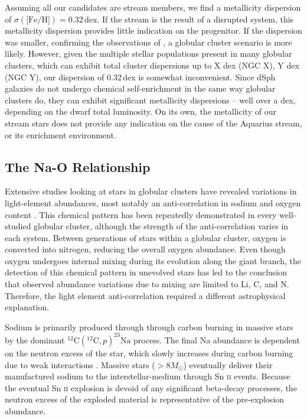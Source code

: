 \documentclass{emulateapj}
\begin{document}
Assuming all our candidates are stream members, we find a metallicity dispersion of $\sigma(\mbox{[Fe/H]}) = 0.32$\,dex. If the stream is the result of a disrupted system, this metallicity dispersion provides little indication on the progenitor. If the dispersion was smaller, confirming the observations of \citet{wylie-de-boer;et-al_2012}, a globular cluster scenario is more likely. However, given the multiple stellar populations present in many globular clusters, which can exhibit total cluster dispersions up to X dex (NGC X), Y dex (NGC Y), our dispersion of 0.32\,dex is somewhat inconvenient. Since dSph galaxies do not undergo chemical self-enrichment in the same way globular clusters do, they can exhibit significant metallicity dispersions \--- well over a dex, depending on the dwarf total luminosity. On its own, the metallicity of our stream stars does not provide any indication on the cause of the Aquarius stream, or its enrichment environment.


\subsection{The Na-O Relationship}


Extensive studies looking at stars in globular clusters have revealed variations in light-element abundances, most notably an anti-correlation in sodium and oxygen content \citet[][and references therein]{norris;da_costa_1995,carretta;et-al_2009_na_o}. This chemical pattern has been repeatedly demonstrated in every well-studied globular cluster, although the strength of the anti-correlation varies in each system. Between generations of stars within a globular cluster, oxygen is converted into nitrogen, reducing the overall oxygen abundance. Even though oxygen undergoes internal mixing during its evolution along the giant branch, the detection of this chemical pattern in unevolved stars has led to the conclusion that observed abundance variations due to mixing are limited to Li, C, and N. Therefore, the light element anti-correlation required a different astrophysical explanation.

Sodium is primarily produced through through carbon burning in massive stars by the dominant $^{12}\mbox{C}(^{12}\mbox{C}, p)^{23}\mbox{Na}$ process. The final Na abundance is dependent on the neutron excess of the star, which slowly increases during carbon burning due to weak interactions \citep{arnett;truran_1974}. Massive stars ($>8 M_\odot$) eventually deliver their manufactured sodium to the interstellar-medium through Sn \textsc{ii} events. Because the eventual Sn \textsc{ii} explosion is devoid of any significant beta-decay processes, the neutron excess of the exploded material is representative of the pre-explosion abundance.  
 
\end{document}
